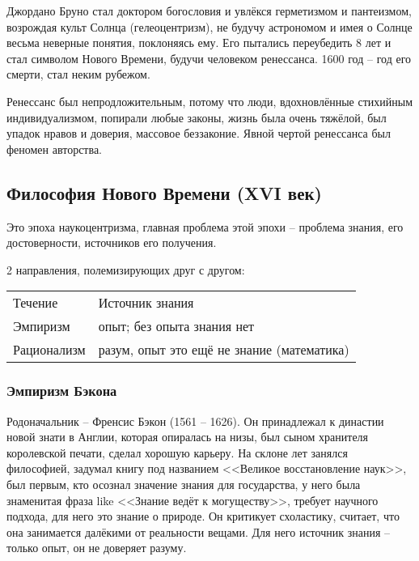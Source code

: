 \documentclass[a4paper, 12pt]{book} %
\begin{document}
Джордано Бруно стал доктором богословия и увлёкся герметизмом и пантеизмом, возрождая культ Солнца (гелеоцентризм), не будучу астрономом и имея о Солнце весьма неверные понятия, поклоняясь ему. Его пытались переубедить 8 лет и стал символом Нового Времени, будучи человеком ренессанса. 1600 год -- год его смерти, стал неким рубежом.

Ренессанс был непродложительным, потому что люди, вдохновлённые стихийным индивидуализмом, попирали любые законы, жизнь была очень тяжёлой, был упадок нравов и доверия, массовое беззаконие. Явной чертой ренессанса был феномен авторства. 
\newpage
\subsection{Философия Нового Времени (XVI век)}
Это эпоха наукоцентризма, главная проблема этой эпохи -- проблема знания, его достоверности, источников его получения.

2 направления, полемизирующих друг с другом:

\begin{table}[]
\begin{tabular}{ll}
Течение     & Источник знания                            \\
Эмпиризм    & опыт; без опыта знания нет                 \\
Рационализм & разум, опыт это ещё не знание (математика)
\end{tabular}
\end{table}

\subsubsection{Эмпиризм Бэкона}
Родоначальник -- Френсис Бэкон (1561 -- 1626). Он принадлежал к династии новой знати в Англии, которая опиралась на низы, был сыном хранителя королевской печати, сделал хорошую карьеру. На склоне лет занялся философией, задумал книгу под названием <<Великое восстановление наук>>, был первым, кто осознал значение знания для государства, у него была знаменитая фраза like <<Знание ведёт к могуществу>>, требует научного подхода, для него это знание о природе. Он критикует схоластику, считает, что она занимается далёкими от реальности вещами. Для него источник знания -- только опыт, он не доверяет разуму.
\end{document}
